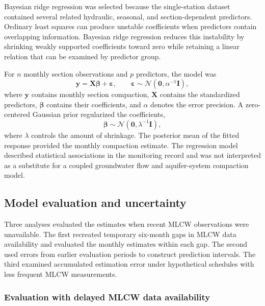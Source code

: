 Bayesian ridge regression was selected because the single-station dataset contained several related hydraulic, seasonal, and section-dependent predictors. Ordinary least squares can produce unstable coefficients when predictors contain overlapping information. Bayesian ridge regression reduces this instability by shrinking weakly supported coefficients toward zero while retaining a linear relation that can be examined by predictor group.

For $n$ monthly section observations and $p$ predictors, the model was
\begin{equation}
\boldsymbol{y}=\boldsymbol{X}\boldsymbol{\beta}+\boldsymbol{\varepsilon},
\qquad
\boldsymbol{\varepsilon}\sim\mathcal{N}(\boldsymbol{0},\alpha^{-1}\boldsymbol{I}),
\label{eq:brr_likelihood}
\end{equation}
where $\boldsymbol{y}$ contains monthly section compaction, $\boldsymbol{X}$ contains the standardized predictors, $\boldsymbol{\beta}$ contains their coefficients, and $\alpha$ denotes the error precision. A zero-centered Gaussian prior regularized the coefficients,
\begin{equation}
\boldsymbol{\beta}\sim\mathcal{N}(\boldsymbol{0},\lambda^{-1}\boldsymbol{I}),
\label{eq:brr_prior}
\end{equation}
where $\lambda$ controls the amount of shrinkage. The posterior mean of the fitted response provided the monthly compaction estimate. The regression model described statistical associations in the monitoring record and was not interpreted as a substitute for a coupled groundwater flow and aquifer-system compaction model.

\subsection{Model evaluation and uncertainty}
\label{subsec:evaluation_framework}

Three analyses evaluated the estimates when recent MLCW observations were unavailable. The first recreated temporary six-month gaps in MLCW data availability and evaluated the monthly estimates within each gap. The second used errors from earlier evaluation periods to construct prediction intervals. The third examined accumulated estimation error under hypothetical schedules with less frequent MLCW measurements.

\subsubsection{Evaluation with delayed MLCW data availability}
\label{subsec:delayed_evaluation}

